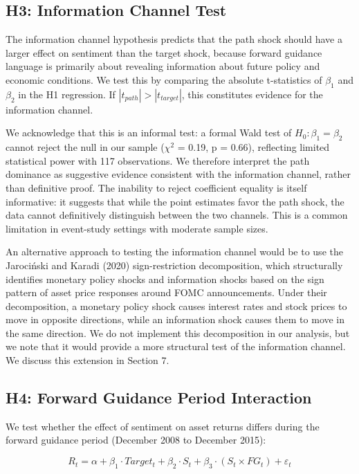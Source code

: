 \documentclass[12pt]{article}
\begin{document}
\subsection{H3: Information Channel Test}

The information channel hypothesis predicts that the path shock should have a larger effect on sentiment than the target shock, because forward guidance language is primarily about revealing information about future policy and economic conditions. We test this by comparing the absolute t-statistics of $\beta_1$ and $\beta_2$ in the H1 regression. If $|t_{path}| > |t_{target}|$, this constitutes evidence for the information channel.

We acknowledge that this is an informal test: a formal Wald test of $H_0: \beta_1 = \beta_2$ cannot reject the null in our sample ($\chi^2$ = 0.19, p = 0.66), reflecting limited statistical power with 117 observations. We therefore interpret the path dominance as suggestive evidence consistent with the information channel, rather than definitive proof. The inability to reject coefficient equality is itself informative: it suggests that while the point estimates favor the path shock, the data cannot definitively distinguish between the two channels. This is a common limitation in event-study settings with moderate sample sizes.

An alternative approach to testing the information channel would be to use the Jarociński and Karadi (2020) sign-restriction decomposition, which structurally identifies monetary policy shocks and information shocks based on the sign pattern of asset price responses around FOMC announcements. Under their decomposition, a monetary policy shock causes interest rates and stock prices to move in opposite directions, while an information shock causes them to move in the same direction. We do not implement this decomposition in our analysis, but we note that it would provide a more structural test of the information channel. We discuss this extension in Section 7.

\subsection{H4: Forward Guidance Period Interaction}

We test whether the effect of sentiment on asset returns differs during the forward guidance period (December 2008 to December 2015):

\begin{equation*}
R_t = \alpha + \beta_1 \cdot Target_t + \beta_2 \cdot S_t + \beta_3 \cdot (S_t \times FG_t) + \varepsilon_t
\end{equation*}
\end{document}
